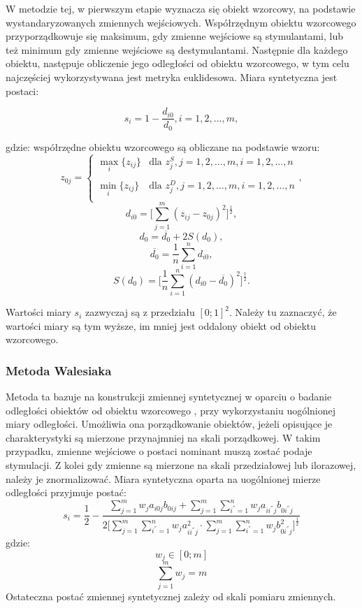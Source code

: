\documentclass[12pt,a4paper]{report}
\begin{document}
W metodzie tej, w pierwszym etapie wyznacza się obiekt wzorcowy, na podstawie wystandaryzowanych zmiennych wejściowych. Współrzędnym obiektu wzorcowego przyporządkowuje się maksimum, gdy zmienne wejściowe są stymulantami, lub też minimum gdy zmienne wejściowe są destymulantami. Następnie dla każdego obiektu, następuje obliczenie jego odległości od obiektu wzorcowego, w tym celu najczęściej wykorzystywana jest metryka euklidesowa. 
Miara syntetyczna jest postaci: 
\begin{center}
$$s_i=1-\frac{d_{i0}}{d_{0}}, i=1, 2, ..., m ,$$
\end{center}
gdzie:
\newline
współrzędne obiektu wzorcowego są obliczane na podstawie wzoru:
$$z_{0j}=\left\{ \begin{array}{ll}
\max\limits_{i} \{z_{ij}\} & \textrm{dla  } z_{j}^S, j=1,2,...,m, i=1,2,...,n\\\\
\min\limits_{i} \{z_{ij}\} & \textrm{dla } z_{j}^D, j=1,2,...,m, i=1,2,...,n\\
\end{array} \right., $$
$$d_{i0}=\bigg[\sum_{j=1}^{m} (z_{ij} - z_{0j})^2 \bigg]^\frac{1}{2} ,$$ 
$$d_{0}=\overline{d_{0}} + 2S(d_{0}) ,$$
$$\overline{d_{0}}=\frac{1}{n}\sum_{i=1}^{n} d_{i0} ,$$
$$S(d_{0})=\bigg[\frac{1}{n}\sum_{i=1}^{n} (d_{i0}-\overline{d_{0}})^2 \bigg]^\frac{1}{2} .$$

Wartości miary $s_{i}$ zazwyczaj są z przedziału $[0; 1]^2$. Należy tu zaznaczyć, że wartości miary są tym wyższe, im mniej jest oddalony obiekt od obiektu wzorcowego. 

\subsubsection{Metoda Walesiaka}
\noindent


Metoda ta bazuje na konstrukcji zmiennej syntetycznej w oparciu o badanie odległości obiektów od obiektu wzorcowego , przy wykorzystaniu uogólnionej miary odległości. Umożliwia ona  porządkowanie obiektów, jeżeli opisujące je charakterystyki są mierzone przynajmniej na skali porządkowej. W takim przypadku, zmienne wejściowe o postaci nominant muszą zostać podaje stymulacji. Z kolei gdy zmienne są mierzone na skali przedziałowej lub ilorazowej, należy je znormalizować. 
Miara syntetyczna oparta na uogólnionej mierze odległości przyjmuje postać:
\begin{equation}
s_i=\frac{1}{2}-\frac{\sum_{j=1}^{m} w_{j}a_{i0j}b_{0ij} + \sum_{j=1}^{m}\sum_{i^{''}=1}^{n} w_{j}a_{ii^{''}j}b_{0i^{''}j}}{2\bigg[\sum_{j=1}^{m}\sum_{i^{''}=1}^{n} w_{j}a^{2}_{ii^{''}j} \cdot \sum_{j=1}^{m}\sum_{i^{''}=1}^{n} w_{j}b^{2}_{0i^{''}j} \bigg]^{\frac{1}{2} }}
\end{equation}
gdzie:
$$w_{j} \in [0; m]$$
$$\sum_{j=1}^{m} w_{j}=m$$
\newline
Ostateczna postać zmiennej syntetycznej zależy od skali pomiaru zmiennych. 
\end{document}
